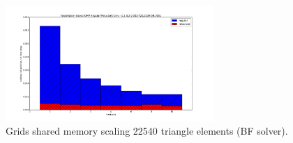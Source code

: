 \documentclass[times,12pt]{article}
\begin{document}

\begin{figure}[htb]
  \begin{center}
    \includegraphics[width=0.7\textwidth]{experiments/omp/omp_mesh_regular-reluctant_20.png}
  \end{center}
  \caption{Grids shared memory scaling 22540 triangle elements (BF solver).}
  \label{figure:omp_regular_reluctant_triangle_20}
\end{figure}
\end{document}
